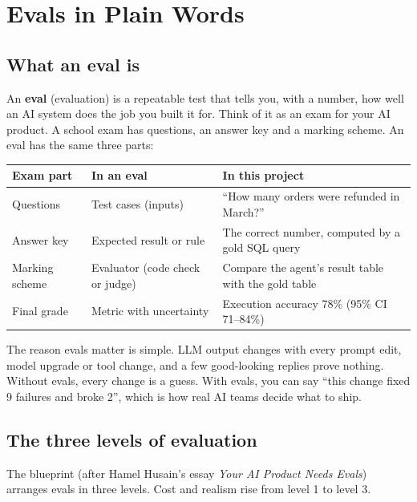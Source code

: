 \documentclass[11pt,a4paper]{article}
\begin{document}
\tableofcontents
\newpage

\section{Evals in Plain Words}

\subsection{What an eval is}

An \textbf{eval} (evaluation) is a repeatable test that tells you, with a number, how well an
AI system does the job you built it for. Think of it as an exam for your AI product. A school
exam has questions, an answer key and a marking scheme. An eval has the same three parts:

\begin{center}
\begin{tabularx}{0.92\linewidth}{@{}l X X@{}}
\toprule
\textbf{Exam part} & \textbf{In an eval} & \textbf{In this project}\\
\midrule
Questions & Test cases (inputs) & ``How many orders were refunded in March?''\\
Answer key & Expected result or rule & The correct number, computed by a gold SQL query\\
Marking scheme & Evaluator (code check or judge) & Compare the agent's result table with the gold table\\
Final grade & Metric with uncertainty & Execution accuracy 78\% (95\% CI 71--84\%)\\
\bottomrule
\end{tabularx}
\end{center}

The reason evals matter is simple. LLM output changes with every prompt edit, model upgrade
or tool change, and a few good-looking replies prove nothing. Without evals, every change is a
guess. With evals, you can say ``this change fixed 9 failures and broke 2'', which is how real
AI teams decide what to ship.

\subsection{The three levels of evaluation}

The blueprint (after Hamel Husain's essay \emph{Your AI Product Needs Evals}) arranges evals in
three levels. Cost and realism rise from level 1 to level 3.
\end{document}
